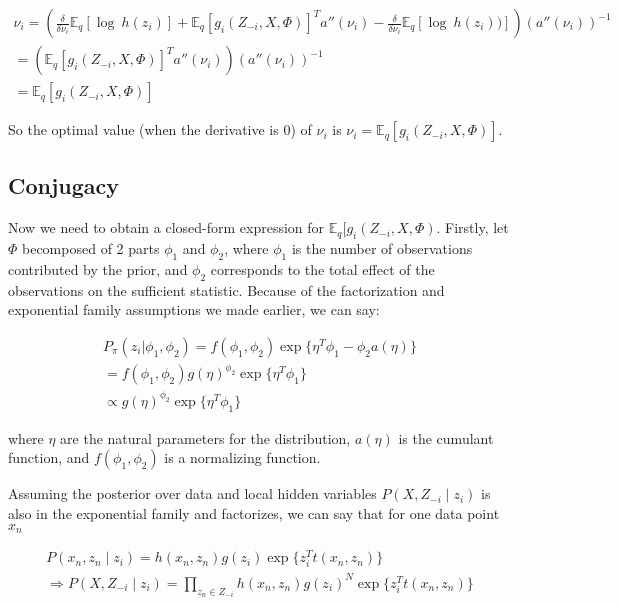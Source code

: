 \begin{align}
\label{expectation_of_g}
\nonumber \nu_i = \left( \frac{\delta}{\delta \nu_i} \mathbb{E}_q [\log\ h(z_i)] + \mathbb{E}_q[g_i(Z_{-i}, X, \Phi)]^Ta''(\nu_i) -  \frac{\delta}{\delta \nu_i} \mathbb{E}_q[\log\ h(z_i))] \right) \left(a''(\nu_i)\right)^{-1} \\
\nonumber =  \left( \mathbb{E}_q[g_i(Z_{-i}, X, \Phi)]^Ta''(\nu_i) \right) \left(a''(\nu_i)\right)^{-1} \\
= \mathbb{E}_q[g_i(Z_{-i}, X, \Phi)]
\end{align}

So the optimal value (when the derivative is $0$) of $\nu_i$ is $\nu_i = \mathbb{E}_q[g_i(Z_{-i}, X, \Phi)]$. 

\subsection{Conjugacy}

Now we need to obtain a closed-form expression for $\mathbb{E}_q[g_i(Z_{-i}, X, \Phi)$. Firstly, let $\Phi$ becomposed of 2 parts $\phi_1$ and $\phi_2$, where $\phi_1$ is the number of observations contributed by the prior, and $\phi_2$ corresponds to the total effect of the observations on the sufficient statistic. Because of the factorization and exponential family assumptions we made earlier, we can say:

\begin{align}
\nonumber P_{\pi}(z_i | \phi_1, \phi_2) = f(\phi_1, \phi_2) \exp\big\{\eta^T\phi_1 - \phi_2 a(\eta)\big\} \\
\nonumber = f(\phi_1, \phi_2) g(\eta)^{\phi_2}\exp\big\{\eta^T\phi_1 \big\}\\
\propto g(\eta)^{\phi_2}\exp\big\{\eta^T\phi_1 \big\}
\end{align}

where $\eta$ are the natural parameters for the distribution, $a(\eta)$ is the cumulant function, and $f(\phi_1, \phi_2)$ is a normalizing function. 

Assuming the posterior over data and local hidden variables $P(X, Z_{-i} \mid z_i)$ is also in the exponential family and factorizes, we can say that for one data point $x_n$ 

\begin{align}
\nonumber P(x_n, z_n \mid z_i) = h(x_n, z_n) g(z_i)\exp\big\{z_i^T t(x_n, z_n)\big\} \\
\Rightarrow P(X,Z_{-i} \mid z_i) = \prod\limits_{z_n \in Z_{-i}}  h(x_n, z_n) g(z_i)^N \exp\big\{z_i^T t(x_n, z_n)\big\} 
\end{align}

